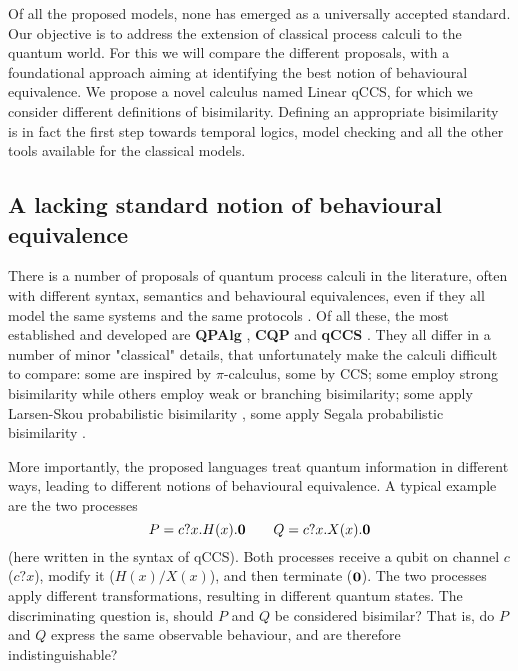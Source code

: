 Of all the proposed models, none has emerged as a universally accepted standard. Our objective is to address the extension of classical process calculi to the quantum world. For this we will compare the different proposals, with a foundational approach aiming at identifying the best notion of behavioural equivalence. We propose a novel calculus named Linear qCCS, for which we consider different definitions of bisimilarity.
Defining an appropriate bisimilarity is in fact the first step towards temporal logics, model checking and all the other tools available for the classical models.


\subsection*{A lacking standard notion of behavioural equivalence}

There is a number of proposals of quantum process calculi in the literature, often with different syntax, semantics and behavioural equivalences, even if they all model the same systems and the same protocols \cite{lalireProcessAlgebraicApproach2004, gayCommunicatingQuantumProcesses2005, fengProbabilisticBisimulationsQuantum2007, yingAlgebraQuantumProcesses2010, wangProbabilisticProcessAlgebra2019}. Of all these, the most established and developed are \textbf{QPAlg} \cite{lalireProcessAlgebraicApproach2004}, \textbf{CQP} \cite{gayCommunicatingQuantumProcesses2005} and \textbf{qCCS} \cite{fengProbabilisticBisimulationsQuantum2007}. They all differ in  a number of minor "classical" details, that unfortunately make the calculi difficult to compare: some are inspired by $\pi$-calculus, some by CCS; some employ strong bisimilarity while others employ weak or branching bisimilarity; some apply Larsen-Skou probabilistic bisimilarity \cite{larsenBisimulationProbabilisticTesting1991}, some apply Segala probabilistic bisimilarity \cite{segalaProbabilisticSimulationsProbabilistic1994}.

More importantly, the proposed languages treat quantum information in different ways, leading to different notions of behavioural equivalence. 
A typical example are the two processes 
\[P = c?x.H(x).\mathbf{0} \qquad Q = c?x.X(x).\mathbf{0}\]
(here written in the syntax of qCCS). Both processes receive a qubit on channel $c$ ($c?x$), modify it ($H(x) / X(x)$), and then terminate ($\mathbf{0}$). The two processes apply different transformations, resulting in different quantum states. The discriminating question is, should $P$ and $Q$ be considered bisimilar? That is, do $P$ and $Q$ express the same observable behaviour, and are therefore indistinguishable? 

